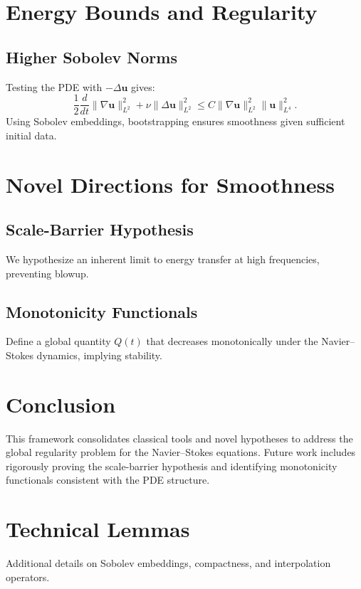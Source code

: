 \documentclass[12pt]{article}
\numberwithin{equation}{section}
\begin{document}
\section{Energy Bounds and Regularity}
\subsection{Higher Sobolev Norms}
Testing the PDE with $-\Delta \mathbf{u}$ gives:
\begin{equation}
    \frac{1}{2} \frac{d}{dt} \|\nabla \mathbf{u}\|_{L^2}^2 + \nu \|\Delta \mathbf{u}\|_{L^2}^2 \leq C \|\nabla \mathbf{u}\|_{L^2}^2 \|\mathbf{u}\|_{L^4}^2.
\end{equation}
Using Sobolev embeddings, bootstrapping ensures smoothness given sufficient initial data.

\section{Novel Directions for Smoothness}
\subsection{Scale-Barrier Hypothesis}
We hypothesize an inherent limit to energy transfer at high frequencies, preventing blowup.
\subsection{Monotonicity Functionals}
Define a global quantity $Q(t)$ that decreases monotonically under the Navier--Stokes dynamics, implying stability.

\section{Conclusion}
This framework consolidates classical tools and novel hypotheses to address the global regularity problem for the Navier--Stokes equations. Future work includes rigorously proving the scale-barrier hypothesis and identifying monotonicity functionals consistent with the PDE structure.

\appendix
\section{Technical Lemmas}
Additional details on Sobolev embeddings, compactness, and interpolation operators.
\end{document}
